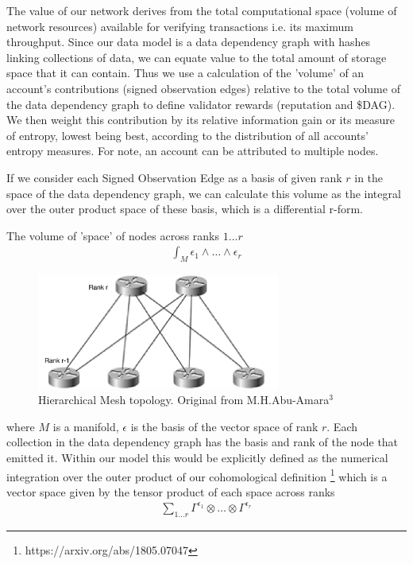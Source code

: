 \documentclass{article}
\begin{document}
The value of our network derives from the total computational space (volume of network resources) available for verifying transactions i.e. its maximum throughput. Since our data model is a data dependency graph with hashes linking collections of data, we can equate value to the total amount of storage space that it can contain. Thus we use a calculation of the 'volume' of an account's contributions (signed observation edges) relative to the total volume of the data dependency graph to define validator rewards (reputation and \$DAG). We then weight this contribution by its relative information gain or its measure of entropy, lowest being best, according to the distribution of all accounts' entropy measures. For note, an account can be attributed to multiple nodes.

If we consider each Signed Observation Edge as a basis of given rank $r$ in the space of the data dependency graph, we can calculate this volume as the integral over the outer product space of these basis, which is a differential r-form.

The volume of 'space' of nodes across ranks $1 \dots r$
\begin{equation*} \label{eq1}
\begin{split}
\int_M \epsilon_1 \wedge \dots \wedge \epsilon_r
\end{split}
\end{equation*}

\begin{figure}[h]
\caption{Hierarchical Mesh topology. Original from M.H.Abu-Amara$^3$}%
\includegraphics[width=8cm]{Designing_a_network_topology-M_H_Abu-Amara}
\centering
\end{figure}

where $M$ is a manifold, $\epsilon$ is the basis of the vector space of rank $r$. Each collection in the data dependency graph has the basis and rank of the node that emitted it. Within our model this would be explicitly defined as the numerical integration over the outer product of our cohomological definition
\footnote{https://arxiv.org/abs/1805.07047} 
which is a vector space given by the tensor product of each space across ranks
\begin{equation*} \label{eq1}
\begin{split}
\sum_{1 \dots r} \Gamma^{\epsilon_1} \otimes \dots \otimes \Gamma^{\epsilon_r}
\end{split}
\end{equation*}
\end{document}
